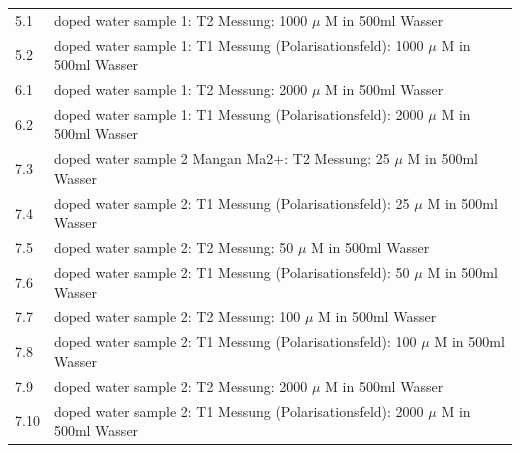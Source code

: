 \begin{tabular}{ll}
           5.1 & doped water sample 1: T2 Messung: 1000 $\mu$ M in 500ml Wasser \\
    
           5.2 & doped water sample 1: T1 Messung (Polarisationsfeld): 1000 $\mu$ M in 500ml Wasser \\

           6.1 & doped water sample 1: T2 Messung: 2000 $\mu$ M in 500ml Wasser \\
    
           6.2 & doped water sample 1: T1 Messung (Polarisationsfeld): 2000 $\mu$ M in 500ml Wasser \\

    

           7.3 & doped water sample 2 Mangan Ma2+: T2 Messung: 25 $\mu$ M in 500ml Wasser \\
    
           7.4 & doped water sample 2: T1 Messung (Polarisationsfeld): 25 $\mu$ M in 500ml Wasser \\
    
           7.5 & doped water sample 2: T2 Messung: 50 $\mu$ M in 500ml Wasser \\
    
           7.6 & doped water sample 2: T1 Messung (Polarisationsfeld): 50 $\mu$ M in 500ml Wasser \\

           7.7 & doped water sample 2: T2 Messung: 100 $\mu$ M in 500ml Wasser \\
    
           7.8 & doped water sample 2: T1 Messung (Polarisationsfeld): 100 $\mu$ M in 500ml Wasser \\

           7.9 & doped water sample 2: T2 Messung: 2000 $\mu$ M in 500ml Wasser \\
    
           7.10 & doped water sample 2: T1 Messung (Polarisationsfeld): 2000 $\mu$ M in 500ml Wasser \\

    
    \end{tabular}  
     
